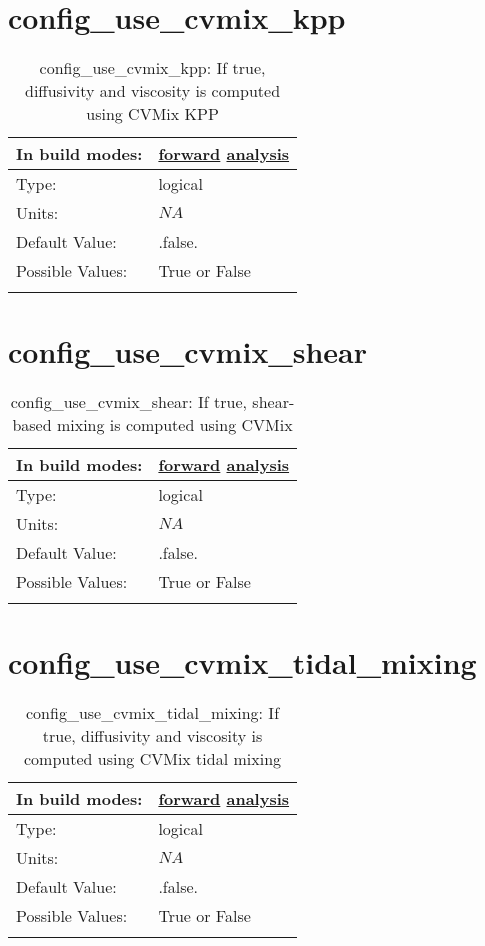 \section[config\_use\_cvmix\_kpp]{config\_use\_cvmix\_kpp}
\label{sec:nm_sec_config_use_cvmix_kpp}
\begin{center}
\begin{longtable}{| p{2.0in} || p{4.0in} |}
    \hline
    In build modes: & \hyperref[subsec:forward_nm_tab_cvmix]{forward} \hyperref[subsec:analysis_nm_tab_cvmix]{analysis} \\
    \hline
    Type: & logical \\
    \hline
    Units: & $NA$ \\
    \hline
    Default Value: & .false. \\
    \hline
    Possible Values: & True or False \\
    \hline
    \caption{config\_use\_cvmix\_kpp: If true, diffusivity and viscosity is computed using CVMix KPP}
\end{longtable}
\end{center}
\section[config\_use\_cvmix\_shear]{config\_use\_cvmix\_shear}
\label{sec:nm_sec_config_use_cvmix_shear}
\begin{center}
\begin{longtable}{| p{2.0in} || p{4.0in} |}
    \hline
    In build modes: & \hyperref[subsec:forward_nm_tab_cvmix]{forward} \hyperref[subsec:analysis_nm_tab_cvmix]{analysis} \\
    \hline
    Type: & logical \\
    \hline
    Units: & $NA$ \\
    \hline
    Default Value: & .false. \\
    \hline
    Possible Values: & True or False \\
    \hline
    \caption{config\_use\_cvmix\_shear: If true, shear-based mixing is computed using CVMix}
\end{longtable}
\end{center}
\section[config\_use\_cvmix\_tidal\_mixing]{config\_use\_cvmix\_tidal\_mixing}
\label{sec:nm_sec_config_use_cvmix_tidal_mixing}
\begin{center}
\begin{longtable}{| p{2.0in} || p{4.0in} |}
    \hline
    In build modes: & \hyperref[subsec:forward_nm_tab_cvmix]{forward} \hyperref[subsec:analysis_nm_tab_cvmix]{analysis} \\
    \hline
    Type: & logical \\
    \hline
    Units: & $NA$ \\
    \hline
    Default Value: & .false. \\
    \hline
    Possible Values: & True or False \\
    \hline
    \caption{config\_use\_cvmix\_tidal\_mixing: If true, diffusivity and viscosity is computed using CVMix tidal mixing}
\end{longtable}
\end{center}
